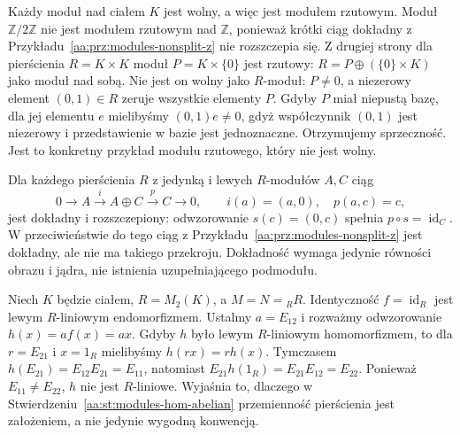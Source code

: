 \begin{przyklad}
\label{aa:prz:modules-projectivity-example}
Każdy moduł nad ciałem $K$ jest wolny,
a więc jest modułem rzutowym. Moduł $\mathbb Z/2\mathbb Z$
nie jest modułem rzutowym nad $\mathbb Z$, ponieważ
krótki ciąg dokładny z
Przykładu~\ref{aa:prz:modules-nonsplit-z} nie rozszczepia
się. Z drugiej strony dla pierścienia
$R=K\times K$ moduł $P=K\times\{0\}$ jest
rzutowy: $R=P\oplus(\{0\}\times K)$ jako
moduł nad sobą. Nie jest on wolny jako $R$-moduł:
$P\ne0$, a niezerowy element $(0,1)\in R$ zeruje
wszystkie elementy $P$. Gdyby $P$ miał niepustą bazę,
dla jej elementu $e$ mielibyśmy $(0,1)e\ne0$,
gdyż współczynnik $(0,1)$ jest niezerowy i
przedstawienie w bazie jest jednoznaczne.
Otrzymujemy sprzeczność. Jest to konkretny
przykład modułu rzutowego, który nie jest wolny.
\end{przyklad}


\begin{przyklad}
\label{aa:prz:modules-split-versus-exact}
Dla każdego pierścienia $R$ z jedynką i lewych $R$-modułów
$A,C$ ciąg
\[
0\longrightarrow A\xrightarrow{i}A\oplus C
\xrightarrow{p}C\longrightarrow0,
\qquad i(a)=(a,0),\quad p(a,c)=c,
\]
jest dokładny i rozszczepiony: odwzorowanie $s(c)=(0,c)$
spełnia $p\circ s=\operatorname{id}_C$. W przeciwieństwie
do tego ciąg z Przykładu~\ref{aa:prz:modules-nonsplit-z}
jest dokładny, ale nie ma takiego przekroju. Dokładność
wymaga jedynie równości obrazu i jądra, nie istnienia
uzupełniającego podmodułu.
\end{przyklad}

\begin{przyklad}
\label{aa:prz:modules-hom-noncommutative}
Niech $K$ będzie ciałem, $R=M_2(K)$, a $M=N={}_RR$.
Identyczność $f=\operatorname{id}_R$ jest lewym
$R$-liniowym endomorfizmem. Ustalmy $a=E_{12}$ i
rozważmy odwzorowanie $h(x)=af(x)=ax$. Gdyby $h$
było lewym $R$-liniowym homomorfizmem, to dla
$r=E_{21}$ i $x=1_R$ mielibyśmy $h(rx)=rh(x)$.
Tymczasem $h(E_{21})=E_{12}E_{21}=E_{11}$,
natomiast $E_{21}h(1_R)=E_{21}E_{12}=E_{22}$.
Ponieważ $E_{11}\ne E_{22}$, $h$ nie jest
$R$-liniowe. Wyjaśnia to, dlaczego w
Stwierdzeniu~\ref{aa:st:modules-hom-abelian}
przemienność pierścienia jest założeniem, a nie
jedynie wygodną konwencją.
\end{przyklad}

